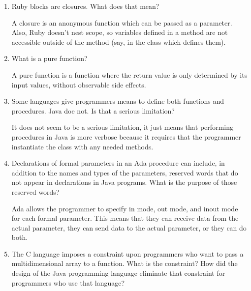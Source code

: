 \begin{enumerate}
\begin{answer}
  \end{answer}
  \item Ruby blocks are closures. What does that mean?

  \begin{answer}
   A closure is an anonymous function which can be passed as a parameter. Also, Ruby doesn't nest scope, so variables defined in a method are not accessible outside of the method (say, in the class which defines them).

  \end{answer}

  \item What is a pure function?

  \begin{answer}
  A pure function is a function where the return value is only determined by its input values, without observable side effects.
  \end{answer}

  \item Some languages give programmers means to define
    both functions and procedures. Java doe not. Is that
    a serious limitation?

  \begin{answer}
  It does not seem to be a serious limitation, it just means that performing procedures in Java is more verbose because it requires that the programmer instantiate the class with any needed methods.
  \end{answer}

  \item Declarations of formal parameters in an Ada procedure
    can include, in addition to the names and types of the
    parameters, reserved words that do not appear in declarations
    in Java programs. 
    What is the purpose of those reserved words?

  \begin{answer}
  Ada allows the programmer to specify in mode, out mode, and inout mode for each formal parameter.  This means that they can receive data from the actual parameter, they can send data to the actual parameter, or they can do both.
  \end{answer}
 
  \item The C language imposes a constraint upon programmers
    who want to pass a multidimensional array to a function.
    What is the constraint? How did the design of the Java
    programming language eliminate that constraint for 
    programmers who use that language?


\end{enumerate}
